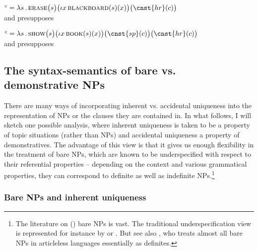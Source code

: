 \documentclass[output=paper,colorlinks,citecolor=brown,newtxmath]{langscibook}
\begin{document}
\ea {}$^c=\lambda s\,.\,\textsc{erase}\big(s\big)\big(\iota x\,\textsc{blackboard}(s)(x)\big)\big(\cnst{hr}(c)\big)$\\
and presupposes   \label{simik:ex:blackboard-tc}
\z

\ea {}$^c=\lambda s\,.\,\textsc{show}\big(s\big)\big(\iota x\,\textsc{book}(s)(x)\big)\big(\cnst{sp}(c)\big)\big(\cnst{hr}(c)\big)$\\\label{simik:ex:kramsky-tc}
and presupposes 
\z



\subsection{The syntax-semantics of bare vs. demonstrative NPs}

There are many ways of incorporating inherent vs. accidental uniqueness into the representation of NPs or the clauses they are contained in. In what follows, I will sketch one possible analysis, where inherent uniqueness is taken to be a property of topic situations (rather than NPs) and accidental uniqueness a property of demonstratives. The advantage of this view is that it gives us enough flexibility in the treatment of bare NPs, which are known to be underspecified with respect to their referential properties -- depending on the context and various grammatical properties, they can correspond to definite as well as indefinite NPs.\footnote{The literature on () bare NPs is vast. The traditional underspecification view is represented for instance by \citet{Chierchia1998} or \citet{Geist2010}. But see also \citet{Dayal2004,Dayal2011}, who treats almost all bare NPs in articleless  languages essentially as definites.}

\subsubsection{Bare NPs and inherent uniqueness}\label{simik:sec:bare-nps-inherent}
\end{document}
